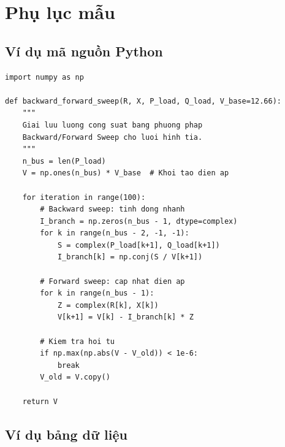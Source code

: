 
\chapter{Phụ lục mẫu}
\label{app:sample}


\section{Ví dụ mã nguồn Python}

\begin{lstlisting}[style=pythonstyle, caption={Hàm tính tổn thất công suất trên lưới điện}, label={lst:app-python}]
import numpy as np

def backward_forward_sweep(R, X, P_load, Q_load, V_base=12.66):
    """
    Giai luu luong cong suat bang phuong phap
    Backward/Forward Sweep cho luoi hinh tia.
    """
    n_bus = len(P_load)
    V = np.ones(n_bus) * V_base  # Khoi tao dien ap

    for iteration in range(100):
        # Backward sweep: tinh dong nhanh
        I_branch = np.zeros(n_bus - 1, dtype=complex)
        for k in range(n_bus - 2, -1, -1):
            S = complex(P_load[k+1], Q_load[k+1])
            I_branch[k] = np.conj(S / V[k+1])

        # Forward sweep: cap nhat dien ap
        for k in range(n_bus - 1):
            Z = complex(R[k], X[k])
            V[k+1] = V[k] - I_branch[k] * Z

        # Kiem tra hoi tu
        if np.max(np.abs(V - V_old)) < 1e-6:
            break
        V_old = V.copy()

    return V
\end{lstlisting}

\section{Ví dụ bảng dữ liệu}

